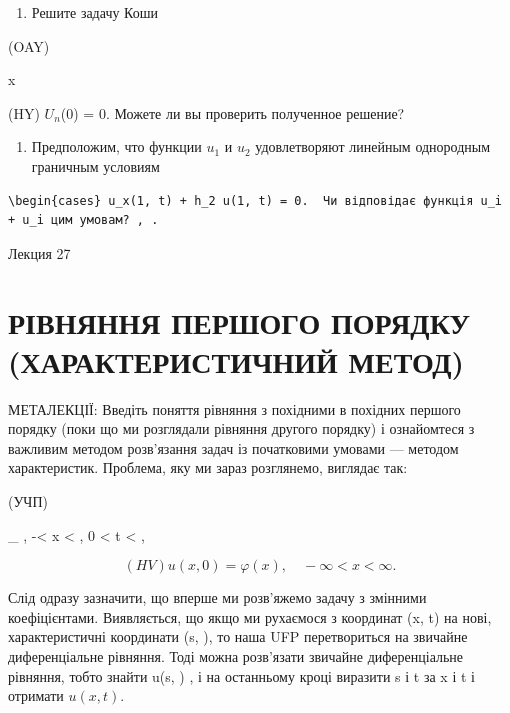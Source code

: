 \documentclass[
  ukrainian,
]{article}
\providecommand{\tightlist}{%
  \setlength{\itemsep}{0pt}\setlength{\parskip}{0pt}}
\begin{document}
\begin{enumerate}
\def\labelenumi{\arabic{enumi}.}
\setcounter{enumi}{4}
\tightlist
\item
  Решите задачу Коши
\end{enumerate}

(OAY)

x

(HY) \(U_n\)(0) = 0. Можете ли вы проверить полученное решение?

\begin{enumerate}
\def\labelenumi{\arabic{enumi}.}
\setcounter{enumi}{5}
\tightlist
\item
  Предположим, что функции \(u_1\) и \(u_2\) удовлетворяют линейным
  однородным граничным условиям
\end{enumerate}

\begin{verbatim}
\begin{cases} u_x(1, t) + h_2 u(1, t) = 0.  Чи відповідає функція u_i + u_i цим умовам? , .
\end{verbatim}

Лекция 27

\section{РІВНЯННЯ ПЕРШОГО ПОРЯДКУ (ХАРАКТЕРИСТИЧНИЙ
МЕТОД)}\label{ux440ux456ux432ux43dux44fux43dux43dux44f-ux43fux435ux440ux448ux43eux433ux43e-ux43fux43eux440ux44fux434ux43aux443-ux445ux430ux440ux430ux43aux442ux435ux440ux438ux441ux442ux438ux447ux43dux438ux439-ux43cux435ux442ux43eux434}

МЕТАЛЕКЦІЇ: Введіть поняття рівняння з похідними в похідних першого
порядку (поки що ми розглядали рівняння другого порядку) і ознайомтеся з
важливим методом розв'язання задач із початковими умовами --- методом
характеристик. Проблема, яку ми зараз розглянемо, виглядає так:

(УЧП)

\_ \textbar, -\infty \textless{} x \textless{} \infty  , 0 \textless{} t
\textless{} \infty  ,

\[
(HV)   u(x, 0) = \varphi(x), \quad -\infty < x < \infty.
\]

Слід одразу зазначити, що вперше ми розв'яжемо задачу з змінними
коефіцієнтами. Виявляється, що якщо ми рухаємося з координат (x, t) на
нові, характеристичні координати (s, \tau), то наша UFP перетвориться на
звичайне диференціальне рівняння. Тоді можна розв'язати звичайне
диференціальне рівняння, тобто знайти u(s, \tau) , і на останньому кроці
виразити s і t за x і t і отримати \(u(x, t)\).
\end{document}
